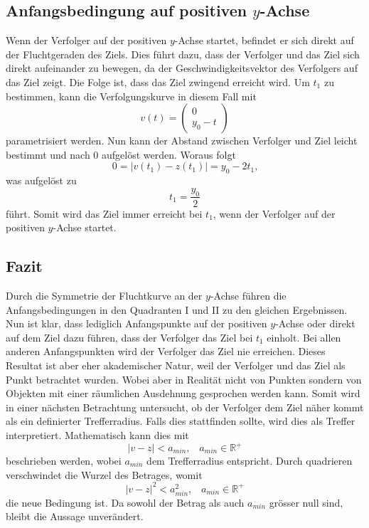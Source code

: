 \subsection{Anfangsbedingung auf positiven $y$-Achse}
Wenn der Verfolger auf der positiven $y$-Achse startet, befindet er sich direkt auf der Fluchtgeraden des Ziels.
Dies führt dazu, dass der Verfolger und das Ziel sich direkt aufeinander zu bewegen, da der Geschwindigkeitsvektor des Verfolgers auf das Ziel zeigt.
Die Folge ist, dass das Ziel zwingend erreicht wird.
Um $t_1$ zu bestimmen, kann die Verfolgungskurve in diesem Fall mit
%
\begin{equation}
    v(t)
    =
    \left( \begin{array}{c} 0 \\ y_0-t \end{array} \right)
\end{equation}
%
parametrisiert werden.
Nun kann der Abstand zwischen Verfolger und Ziel leicht bestimmt und nach 0 aufgelöst werden.
Woraus folgt
%
\begin{equation}
    0
    =
    |v(t_1)-z(t_1)|
    =
    y_0-2t_1\text{,}
\end{equation}
%
was aufgelöst zu
%
\begin{equation}
    t_1
    =
    \frac{y_0}{2}
\end{equation}
%
führt.
Somit wird das Ziel immer erreicht bei $t_1$, wenn der Verfolger auf der positiven $y$-Achse startet.
\subsection{Fazit}
Durch die Symmetrie der Fluchtkurve an der $y$-Achse führen die Anfangsbedingungen in den Quadranten \RN{1} und \RN{2} zu den gleichen Ergebnissen. Nun ist klar, dass lediglich Anfangspunkte auf der positiven $y$-Achse oder direkt auf dem Ziel dazu führen, dass der Verfolger das Ziel bei $t_1$ einholt.
Bei allen anderen Anfangspunkten wird der Verfolger das Ziel nie erreichen.
Dieses Resultat ist aber eher akademischer Natur, weil der Verfolger und das Ziel als Punkt betrachtet wurden.
Wobei aber in Realität nicht von Punkten sondern von Objekten mit einer räumlichen Ausdehnung gesprochen werden kann.
Somit wird in einer nächsten Betrachtung untersucht, ob der Verfolger dem Ziel näher kommt als ein definierter Trefferradius.
Falls dies stattfinden sollte, wird dies als Treffer interpretiert.
Mathematisch kann dies mit
%
\begin{equation}
    |v-z|<a_{min} \text{,}\quad a_{min}\in\mathbb{R}^+
\end{equation}
%
beschrieben werden, wobei $a_{min}$ dem Trefferradius entspricht.
Durch quadrieren verschwindet die Wurzel des Betrages, womit
%
\begin{equation}
    |v-z|^2<a_{min}^2 \text{,}\quad a_{min}\in \mathbb{R}^+
\end{equation}
%
die neue Bedingung ist.
Da sowohl der Betrag als auch $a_{min}$ grösser null sind, bleibt die Aussage unverändert.





